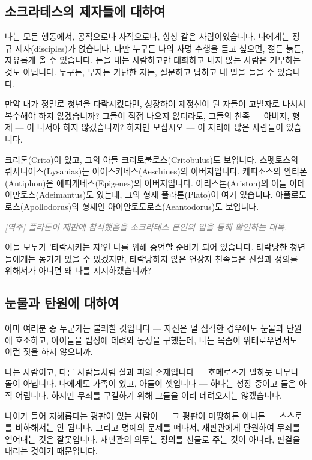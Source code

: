 \documentclass[11pt, a4paper]{article}
\newcommand{\tnote}[1]{\par\noindent\textit{\textcolor{gray}{[역주] #1}}\par\smallskip}
\begin{document}
\bigskip


\subsection{소크라테스의 제자들에 대하여}


나는 모든 행동에서, 공적으로나 사적으로나, 항상 같은 사람이었습니다. 나에게는 정규 제자(disciples)가 없습니다. 다만 누구든 나의 사명 수행을 듣고 싶으면, 젊든 늙든, 자유롭게 올 수 있습니다. 돈을 내는 사람하고만 대화하고 내지 않는 사람은 거부하는 것도 아닙니다. 누구든, 부자든 가난한 자든, 질문하고 답하고 내 말을 들을 수 있습니다.


만약 내가 정말로 청년을 타락시켰다면, 성장하여 제정신이 된 자들이 고발자로 나서서 복수해야 하지 않겠습니까? 그들이 직접 나오지 않더라도, 그들의 친족 — 아버지, 형제 — 이 나서야 하지 않겠습니까? 하지만 보십시오 — 이 자리에 많은 사람들이 있습니다.


크리톤(Crito)이 있고, 그의 아들 크리토불로스(Critobulus)도 보입니다. 스펫토스의 뤼사니아스(Lysanias)는 아이스키네스(Aeschines)의 아버지입니다. 케피소스의 안티폰(Antiphon)은 에피게네스(Epigenes)의 아버지입니다. 아리스톤(Ariston)의 아들 아데이만토스(Adeimantus)도 있는데, 그의 형제 플라톤(Plato)이 여기 있습니다. 아폴로도로스(Apollodorus)의 형제인 아이안토도로스(Aeantodorus)도 보입니다.


\tnote{플라톤이 재판에 참석했음을 소크라테스 본인의 입을 통해 확인하는 대목.}


이들 모두가 '타락시키는 자'인 나를 위해 증언할 준비가 되어 있습니다. 타락당한 청년들에게는 동기가 있을 수 있겠지만, 타락당하지 않은 연장자 친족들은 진실과 정의를 위해서가 아니면 왜 나를 지지하겠습니까?


\bigskip


\subsection{눈물과 탄원에 대하여}


아마 여러분 중 누군가는 불쾌할 것입니다 — 자신은 덜 심각한 경우에도 눈물과 탄원에 호소하고, 아이들을 법정에 데려와 동정을 구했는데, 나는 목숨이 위태로우면서도 이런 짓을 하지 않으니까.


나는 사람이고, 다른 사람들처럼 살과 피의 존재입니다 — 호메로스가 말하듯 나무나 돌이 아닙니다. 나에게도 가족이 있고, 아들이 셋입니다 — 하나는 성장 중이고 둘은 아직 어립니다. 하지만 무죄를 구걸하기 위해 그들을 이리 데려오지는 않겠습니다.


나이가 들어 지혜롭다는 평판이 있는 사람이 — 그 평판이 마땅하든 아니든 — 스스로를 비하해서는 안 됩니다. 그리고 명예의 문제를 떠나서, 재판관에게 탄원하여 무죄를 얻어내는 것은 잘못입니다. 재판관의 의무는 정의를 선물로 주는 것이 아니라, 판결을 내리는 것이기 때문입니다.
\end{document}
